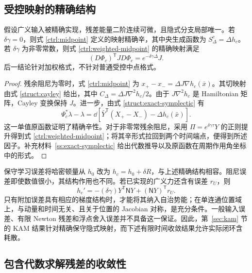 \subsection{受控映射的精确结构}
\label{ctrl:structure}

\begin{proposition}[补偿后的结构]
\label{ctrl:structure-proposition}
假设广义输入被精确实现，残差能量二阶连续可微，且隐式分支局部唯一。若 $\delta\gamma=0$，则式 \eqref{ctrl:midpoint} 定义的映射精确辛，其中央生成函数为 $S_\Delta^c=\Delta h_c$。若 $\delta\gamma$ 为非零常数，则式 \eqref{ctrl:weighted-midpoint} 的精确映射满足
\[
 (D\Phi_c)^{\mathsf T}JD\Phi_c=e^{-\delta\gamma\Delta}J.
\]
后一结论针对加权格式，不针对普通受控中点格式。
\end{proposition}

\begin{proof}
残余阻尼为零时，式 \eqref{ctrl:midpoint} 为
$x_+-x_-=\Delta J\nabla h_c(\bar x)$。其切映射由式 \eqref{struct:cayley} 给出，其中 $C_\Delta=\Delta J\nabla^2h_c/2$。由于 $J\nabla^2h_c$ 是 Hamiltonian 矩阵，Cayley 变换保持 $J$。进一步，由式 \eqref{struct:exact-symplectic} 有
\begin{equation}\label{ctrl:exact-primitive}
 \Psi_c^*\lambda-\lambda
 =\dd[\bar Y^{\mathsf T}(X_+-X_-)-\Delta h_c(\bar x)].
\end{equation}
这一单值原函数证明了精确辛性。对于非零常残余阻尼，采用
$\Pi=e^{\delta\gamma\tau}Y$ 的正则提升得到式 \eqref{ctrl:weighted-midpoint}；将其辛形式拉回到两个时间端点，便得到所述因子。补充材料~\ref{ss:exact-symplectic} 给出代数推导以及原函数在周期作用角坐标中的形式。
\end{proof}

保守学习误差将哈密顿量从 $h_0$ 改为 $h_c=h_0+\delta R$，与上述精确结构相容。阻尼误差即使数值很小，其结构作用也不同。若已实现的广义力还含有误差 $r_U$，则
\begin{equation}\label{ctrl:power}
 h_c'=-(\delta\gamma)Y^{\mathsf T}\mathsf N Y
                         +(\mathsf N Y)^{\mathsf T}r_U.
\end{equation}
只有附加误差具有相应的梯度结构时，才能将其纳入自治势能；在单连通位置域上，与动量和时间无关、且关于位置的 Jacobian 对称，是充分条件。一般输入误差、有限 Newton 残差和浮点舍入误差并不具备这一保证。因此，第~\ref{sec:kam} 节的 KAM 结果针对精确保守隐式映射，而下述有限时间收敛结果允许实际闭环含耗散。

\subsection{包含代数求解残差的收敛性}
\label{ctrl:convergence-section}

